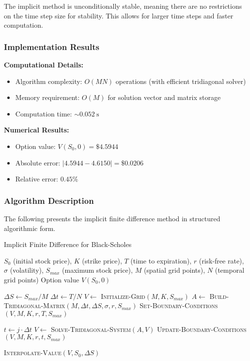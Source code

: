\documentclass[12pt,a4paper]{article}
\numberwithin{algorithm}{subsection}
\begin{document}
The implicit method is unconditionally stable, meaning there are no restrictions on the time step size for stability. This allows for larger time steps and faster computation.

\subsubsection{Implementation Results}

\textbf{Computational Details:}
\begin{itemize}
\item Algorithm complexity: $O(MN)$ operations (with efficient tridiagonal solver)
\item Memory requirement: $O(M)$ for solution vector and matrix storage
\item Computation time: $\sim\SI{0.052}{\second}$
\end{itemize}

\textbf{Numerical Results:}
\begin{itemize}
\item Option value: $V(S_0, 0) = \$4.5944$
\item Absolute error: $|4.5944 - 4.6150| = \$0.0206$
\item Relative error: $0.45\%$
\end{itemize}

\subsubsection{Algorithm Description}

The following presents the implicit finite difference method in structured algorithmic form.

\begin{algorithm}[H]
\caption{Implicit Finite Difference for Black-Scholes}
\begin{algorithmic}[1]
\REQUIRE $S_0$ (initial stock price), $K$ (strike price), $T$ (time to expiration), $r$ (risk-free rate), $\sigma$ (volatility), $S_{max}$ (maximum stock price), $M$ (spatial grid points), $N$ (temporal grid points)
\ENSURE Option value $V(S_0, 0)$

\STATE $\Delta S \leftarrow S_{max} / M$
\STATE $\Delta t \leftarrow T / N$
\STATE $V \leftarrow$ \textsc{Initialize-Grid}$(M, K, S_{max})$
\STATE $A \leftarrow$ \textsc{Build-Tridiagonal-Matrix}$(M, \Delta t, \Delta S, \sigma, r, S_{max})$
\STATE \textsc{Set-Boundary-Conditions}$(V, M, K, r, T, S_{max})$

    \STATE $t \leftarrow j \cdot \Delta t$
    \STATE $V \leftarrow$ \textsc{Solve-Tridiagonal-System}$(A, V)$
    \STATE \textsc{Update-Boundary-Conditions}$(V, M, K, r, t, S_{max})$
\ENDFOR

\RETURN \textsc{Interpolate-Value}$(V, S_0, \Delta S)$
\end{algorithmic}
\end{algorithm}
\end{document}
